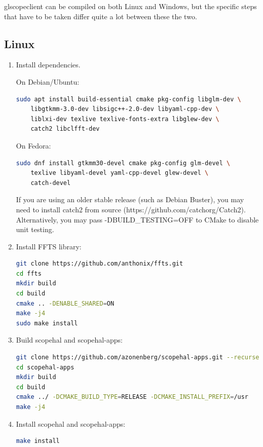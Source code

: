 glscopeclient can be compiled on both Linux and Windows, but the specific steps that have to be taken differ quite a
lot between these the two.

\subsection{Linux}
\begin{enumerate}

\item Install dependencies.

On Debian/Ubuntu:

\begin{lstlisting}[language=sh]
sudo apt install build-essential cmake pkg-config libglm-dev \
	libgtkmm-3.0-dev libsigc++-2.0-dev libyaml-cpp-dev \
	liblxi-dev texlive texlive-fonts-extra libglew-dev \
	catch2 libclfft-dev
\end{lstlisting}

On Fedora:

\begin{lstlisting}[language=sh]
sudo dnf install gtkmm30-devel cmake pkg-config glm-devel \
	texlive libyaml-devel yaml-cpp-devel glew-devel \
	catch-devel
\end{lstlisting}

If you are using an older stable release (such as Debian Buster), you may need to install catch2 from source
(https://github.com/catchorg/Catch2). Alternatively, you may pass -DBUILD\_TESTING=OFF to CMake to disable unit testing.

\item Install FFTS library:

\begin{lstlisting}[language=sh]
git clone https://github.com/anthonix/ffts.git
cd ffts
mkdir build
cd build
cmake .. -DENABLE_SHARED=ON
make -j4
sudo make install
\end{lstlisting}

\item Build scopehal and scopehal-apps:

\begin{lstlisting}[language=sh]
git clone https://github.com/azonenberg/scopehal-apps.git --recurse-submodules
cd scopehal-apps
mkdir build
cd build
cmake ../ -DCMAKE_BUILD_TYPE=RELEASE -DCMAKE_INSTALL_PREFIX=/usr
make -j4
\end{lstlisting}

\item Install scopehal and scopehal-apps:

\begin{lstlisting}[language=sh]
make install
\end{lstlisting}

\end{enumerate}

